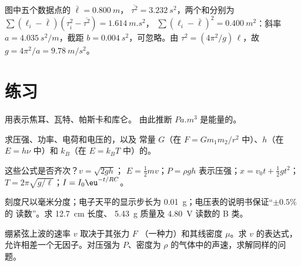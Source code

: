 \begin{example}[由斜率读取 $g$]\label{ex:b1:units-dimensions:slope}
图中五个数据点的 $\bar\ell = \qty{0.800}{m}$，
$\overline{\tau^2} = \qty{3.232}{s^2}$，两个和分别为
$\sum (\ell_i - \bar\ell)(\tau_i^2 - \overline{\tau^2}) = \qty{1.614}{m.s^2}$，
$\sum (\ell_i - \bar\ell)^2 = \qty{0.400}{m^2}$：斜率
$a = \qty{4.035}{s^2/m}$，截距 $b = \qty{0.004}{s^2}$，可忽略。由
$\tau^2 = (4\pi^2/g)\,\ell$，故 $g = 4\pi^2/a = \qty{9.78}{m/s^2}$。
\end{example}

\section{练习}

\begin{exercise}[$\star$]\label{exo:b1:units-dimensions:1}
用表示焦耳、瓦特、帕斯卡和库仑。
由此推断 $\unit{Pa.m^3}$ 是能量的。
\end{exercise}

\begin{exercise}[$\star$]\label{exo:b1:units-dimensions:2}
求压强、功率、电荷和电压的，以及
常量 $G$（在 $F = Gm_1m_2/r^2$ 中）、$h$（在
$E = h\nu$ 中）和 $k_B$（在 $E = k_B T$ 中）的。
\end{exercise}

\begin{exercise}[$\star$]\label{exo:b1:units-dimensions:3}
这些公式是否齐次？$v = \sqrt{2gh}$；
$E = \tfrac12 m v$；$P = \rho g h$ 表示压强；$x = v_0 t +
\tfrac12 g t^2$；$T = 2\pi\sqrt{g/\ell}$；$I = I_0 \eu^{-t/RC}$。
\end{exercise}

\begin{exercise}[$\star$]\label{exo:b1:units-dimensions:4}
刻度尺以毫米分度；电子天平的显示步长为
\qty{0.01}{g}；电压表的说明书保证“$\pm 0.5\%$ 的
读数”。求 \qty{12.7}{cm} 长度、
\qty{5.43}{g} 质量及 \qty{4.80}{V} 读数的 B 类。
\end{exercise}

\begin{exercise}[$\star\star$]\label{exo:b1:units-dimensions:5}
绷紧弦上波的速率 $v$ 取决于其张力 $F$
（一种力）和其线密度 $\mu$。求 $v$ 的表达式，
允许相差一个无因子。对压强为 $P$、密度为
$\rho$ 的气体中的声速，求解同样的问题。
\end{exercise}

